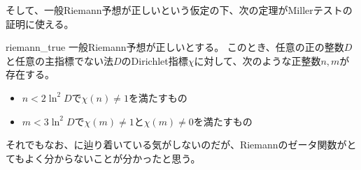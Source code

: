 そして、一般Riemann予想が正しいという仮定の下、次の定理がMillerテストの証明に使える。

\begin{Theo}{}{riemann_true}
一般Riemann予想が正しいとする。
このとき、任意の正の整数$D$と任意の主指標でない法$D$のDirichlet指標$\chi$に対して、次のような正整数$n,m$が存在する。
\begin{itemize}
\item $n<2\ln^2D$で$\chi(n)\neq1$を満たすもの
\item $m<3\ln^2D$で$\chi(m)\neq1$と$\chi(m)\neq0$を満たすもの
\end{itemize}
\end{Theo}

それでもなお、に辿り着いている気がしないのだが、Riemannのゼータ関数がとてもよく分からないことが分かったと思う。

